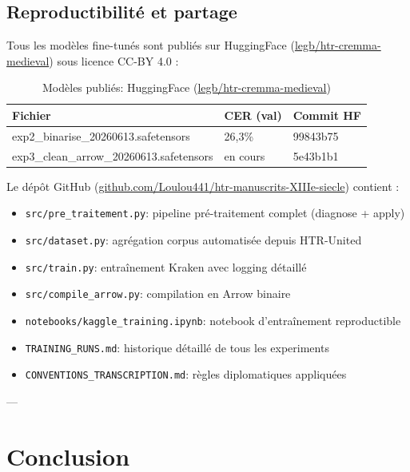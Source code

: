 ﻿\documentclass[twoside,twocolumn,10pt]{article}
\begin{document}
\subsection{Reproductibilité et partage}

Tous les modèles fine-tunés sont publiés sur HuggingFace \cite{huggingface2020} (\href{https://huggingface.co/legb/htr-cremma-medieval}{legb/htr-cremma-medieval}) sous licence CC-BY 4.0 :

\begin{table}[!htbp]
\fontsize{10}{10}\selectfont
\centering
\caption{Modèles publiés: HuggingFace (\href{https://huggingface.co/legb/htr-cremma-medieval}{legb/htr-cremma-medieval})}
\begin{tabular}{L{5.5cm}C{0.5cm}C{1.1cm}}
\toprule
Fichier & CER (val) & Commit HF \\
\midrule
exp2\_binarise\_20260613.safetensors & 26,3\% & 99843b75 \\
exp3\_clean\_arrow\_20260613.safetensors & en cours & 5e43b1b1 \\
\bottomrule
\end{tabular}
\end{table}

Le dépôt GitHub (\href{https://github.com/Loulou441/htr-manuscrits-XIIIe-siecle/tree/fine_tuning}{github.com/Loulou441/htr-manuscrits-XIIIe-siecle}) contient :

\begin{itemize}
  \item \texttt{src/pre\_traitement.py}: pipeline pré-traitement complet (diagnose + apply)
  \item \texttt{src/dataset.py}: agrégation corpus automatisée depuis HTR-United
  \item \texttt{src/train.py}: entraînement Kraken avec logging détaillé
  \item \texttt{src/compile\_arrow.py}: compilation en Arrow binaire
  \item \texttt{notebooks/kaggle\_training.ipynb}: notebook d'entraînement reproductible
  \item \texttt{TRAINING\_RUNS.md}: historique détaillé de tous les experiments
  \item \texttt{CONVENTIONS\_TRANSCRIPTION.md}: règles diplomatiques appliquées
\end{itemize}

---

\section{Conclusion}
\fontsize{11}{13}\selectfont
\justifying
\end{document}
